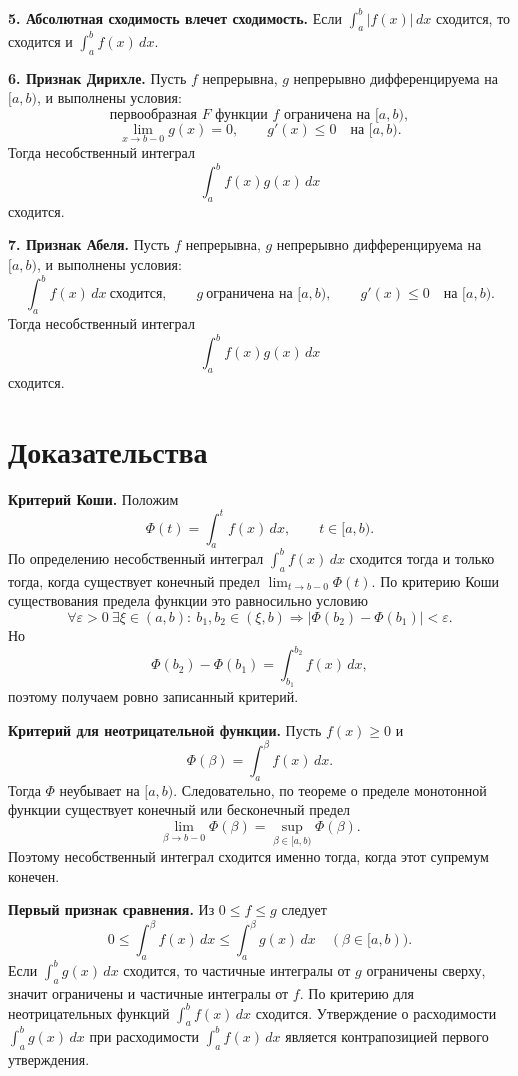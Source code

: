 \documentclass[12pt,a4paper]{article}
\newcommand{\eps}{\varepsilon}
\newcommand{\dd}{\,d}
\begin{document}
\textbf{5. Абсолютная сходимость влечет сходимость.}
Если \(\int_a^b |f(x)|\dd x\) сходится, то сходится и
\(\int_a^b f(x)\dd x\).

\textbf{6. Признак Дирихле.}
Пусть \(f\) непрерывна, \(g\) непрерывно дифференцируема на \([a,b)\), и
выполнены условия:
\[
  \text{первообразная }F\text{ функции }f\text{ ограничена на }[a,b),
\]
\[
  \lim_{x\to b-0}g(x)=0,\qquad g'(x)\le0\quad\text{на }[a,b).
\]
Тогда несобственный интеграл
\[
  \int_a^b f(x)g(x)\dd x
\]
сходится.

\textbf{7. Признак Абеля.}
Пусть \(f\) непрерывна, \(g\) непрерывно дифференцируема на \([a,b)\), и
выполнены условия:
\[
  \int_a^b f(x)\dd x\ \text{сходится},\qquad
  g\ \text{ограничена на }[a,b),\qquad
  g'(x)\le0\quad\text{на }[a,b).
\]
Тогда несобственный интеграл
\[
  \int_a^b f(x)g(x)\dd x
\]
сходится.

\section*{Доказательства}

\textbf{Критерий Коши.}
Положим
\[
  \Phi(t)=\int_a^t f(x)\dd x,\qquad t\in[a,b).
\]
По определению несобственный интеграл \(\int_a^b f(x)\dd x\) сходится тогда и
только тогда, когда существует конечный предел \(\lim_{t\to b-0}\Phi(t)\).
По критерию Коши существования предела функции это равносильно условию
\[
  \forall\eps>0\ \exists\xi\in(a,b):\
  b_1,b_2\in(\xi,b)\Rightarrow
  |\Phi(b_2)-\Phi(b_1)|<\eps .
\]
Но
\[
  \Phi(b_2)-\Phi(b_1)=\int_{b_1}^{b_2}f(x)\dd x,
\]
поэтому получаем ровно записанный критерий.

\textbf{Критерий для неотрицательной функции.}
Пусть \(f(x)\ge0\) и
\[
  \Phi(\beta)=\int_a^\beta f(x)\dd x.
\]
Тогда \(\Phi\) неубывает на \([a,b)\). Следовательно, по теореме о пределе
монотонной функции существует конечный или бесконечный предел
\[
  \lim_{\beta\to b-0}\Phi(\beta)=\sup_{\beta\in[a,b)}\Phi(\beta).
\]
Поэтому несобственный интеграл сходится именно тогда, когда этот супремум
конечен.

\textbf{Первый признак сравнения.}
Из \(0\le f\le g\) следует
\[
  0\le\int_a^\beta f(x)\dd x\le\int_a^\beta g(x)\dd x
  \quad(\beta\in[a,b)).
\]
Если \(\int_a^b g(x)\dd x\) сходится, то частичные интегралы от \(g\)
ограничены сверху, значит ограничены и частичные интегралы от \(f\). По
критерию для неотрицательных функций \(\int_a^b f(x)\dd x\) сходится.
Утверждение о расходимости \(\int_a^b g(x)\dd x\) при расходимости
\(\int_a^b f(x)\dd x\) является контрапозицией первого утверждения.
\end{document}
